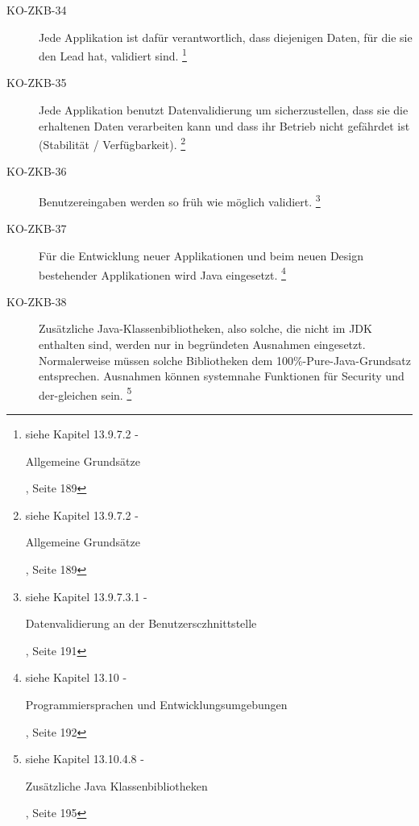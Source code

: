 \documentclass[abstracton, listof=totocnumbered,
bibliography=totocnumbered]{scrreprt}
\begin{document}
\begin{description}
    \item[KO-ZKB-34] Jede Applikation ist dafür verantwortlich, dass diejenigen
    Daten, für die sie den Lead hat, validiert sind.
    \footnote{siehe Kapitel 13.9.7.2 -
    \begin{itshape}Allgemeine Grundsätze\end{itshape}, Seite 189}
    
    \item[KO-ZKB-35] Jede Applikation benutzt Datenvalidierung um
    sicherzustellen, dass sie die erhaltenen Daten verarbeiten kann und dass ihr Betrieb nicht
    gefährdet ist (Stabilität / Verfügbarkeit).
    \footnote{siehe Kapitel 13.9.7.2 -
    \begin{itshape}Allgemeine Grundsätze\end{itshape}, Seite 189}
    
    \item[KO-ZKB-36] Benutzereingaben werden so früh wie möglich validiert.
    \footnote{siehe Kapitel 13.9.7.3.1 -
    \begin{itshape}Datenvalidierung an der Benutzersczhnittstelle\end{itshape},
    Seite 191}
    
    \item[KO-ZKB-37] Für die Entwicklung neuer Applikationen und beim neuen
    Design bestehender Applikationen wird Java eingesetzt.
    \footnote{siehe Kapitel 13.10 -
    \begin{itshape}Programmiersprachen und Entwicklungsumgebungen\end{itshape},
    Seite 192}
    
    \item[KO-ZKB-38] Zusätzliche Java-Klassenbibliotheken, also solche, die
    nicht im JDK enthalten sind, werden nur in begründeten Ausnahmen eingesetzt.
    Normalerweise müssen solche Bibliotheken dem 100\%-Pure-Java-Grundsatz
    entsprechen. Ausnahmen können systemnahe Funktionen für Security und
    der-gleichen sein.
    \footnote{siehe Kapitel 13.10.4.8 -
    \begin{itshape}Zusätzliche Java Klassenbibliotheken\end{itshape}, Seite 195}
    

\end{description}
\end{document}
